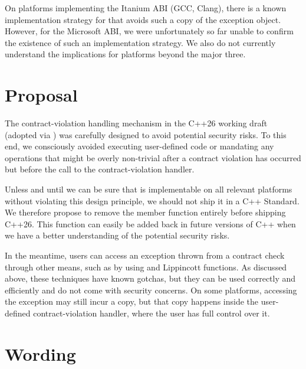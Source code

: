 On platforms implementing the Itanium ABI (GCC, Clang), there is a known implementation strategy for    that avoids such a copy of the exception object. However, for the Microsoft ABI, we were unfortunately so far unable to confirm the existence of such an implementation strategy. We also do not currently understand the implications for platforms beyond the major three.

\section{Proposal}

The contract-violation handling mechanism in the C++26 working draft (adopted via \cite{P2811R7}) was carefully designed to avoid potential security risks. To this end, we consciously avoided executing user-defined code or mandating any operations that might be overly non-trivial after a contract violation has occurred but before the call to the contract-violation handler.

Unless and until we can be sure that  is implementable on all relevant platforms without violating this design principle, we should not ship it in a C++ Standard. We therefore propose to remove the member function  entirely before shipping C++26. This function can easily be added back in future versions of C++ when we have a better understanding of the potential security risks.

In the meantime, users can access an exception thrown from a contract check through other means, such as by using  and Lippincott functions. As discussed above, these techniques have known gotchas, but they can be used correctly and efficiently and do not come with security concerns. On some platforms, accessing the exception may still incur a copy, but that copy happens inside the user-defined contract-violation handler, where the user has full control over it.

\section{Wording}


